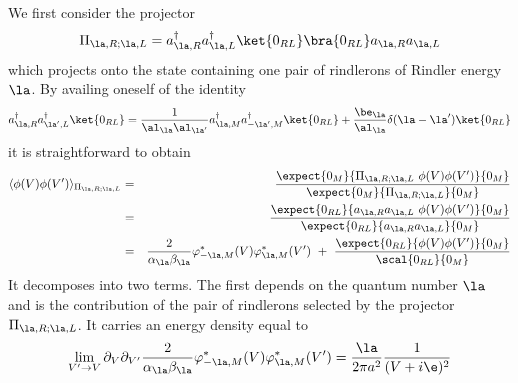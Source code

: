 \documentclass[12pt]{article}
\begin{document}
We first consider the projector
\begin{equation}
\Pi_{\la,R;\la,L} = a^\dagger_{\la,R} a^\dagger_{\la,L}
\ket{0_{RL}}\bra{0_{RL}} a_{\la,R} a_{\la,L}
\end{equation}
which projects onto the state containing one pair of
rindlerons of Rindler energy $\la$.
By availing
oneself of the identity
\begin{equation}
  a_{\la,R}^\dagger a_{\la^\prime,L}^\dagger \ket{0_{RL}} ={1 \over \al_\la
\al_{\la^\prime} } a_{\la,M}^\dagger a_{-\la^\prime,M}^\dagger
\ket{0_{RL}} + {
\be_\la \over \al_\la} \delta ( \la -
\la^\prime )\ket{0_{RL}} \end{equation}
it is
straightforward to obtain
\begin{eqnarray}
\langle \phi(V)\phi(V^\prime) \rangle_{\Pi_{\la,R;\la,L}} &=& \expect
{0_{M}}{\Pi_{\la,R;\la,L}\ \phi(V)\phi(V^\prime)}{0_M} \over  \expect
{0_{M}}{\Pi_{\la,R;\la,L}}{0_M} \nonumber\\
&=& \expect
{0_{RL}}{a_{\la,R}a_{\la,L}\ \phi(V)\phi(V^\prime)}{0_M} \over  \expect
{0_{RL}}{a_{\la,R}a_{\la,L}}{0_M} \nonumber\\ &=& {2 \over
\alpha_{\la}\beta_{\la}} \varphi_{-\la , M}^* (V)
 \varphi_{\la , M}^* (V^\prime) \ + \  {
\expect{0_{RL}}{\phi(V)\phi(V^\prime)}{0_M} \over  \scal {0_{RL}}{0_M} }
\label{threefouri} \end{eqnarray}
 It decomposes into two terms. The first depends on the quantum number $\la$
and is the contribution of the pair of rindlerons
selected by the projector $\Pi_{\la,R;\la,L}$.
It carries an energy density equal to  \begin{equation} \lim_{V^\prime
\rightarrow
V}
\partial_V \partial_{V^\prime}{2 \over \alpha_{\la}\beta_{\la}} \varphi_{-\la
, M}^* (V)
 \varphi_{\la , M}^* (V^\prime)= {\la \over 2 \pi a^2}{1 \over (V + i \e)^2}
\label{threefourii} \end{equation}
\end{document}
